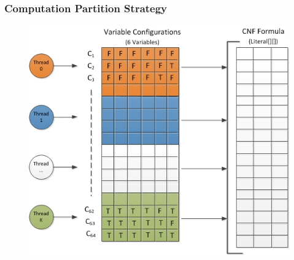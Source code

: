 \documentclass[handout,10pt]{beamer}
\begin{document}

\begin{frame}
	\frametitle{Computation Partition Strategy}
\begin{figure}
\centering
\includegraphics[scale = 0.5]{teamdesign.jpg}
\end{figure}
\end{frame}
\end{document}
